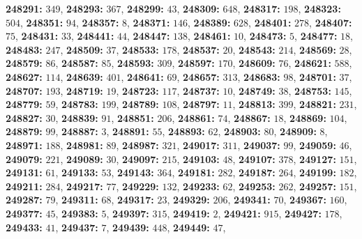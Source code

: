 \textsf{\bfseries 248291:} $349$, \textsf{\bfseries 248293:} $367$, \textsf{\bfseries 248299:} $43$, \textsf{\bfseries 248309:} $648$, \textsf{\bfseries 248317:} $198$, \textsf{\bfseries 248323:} $504$, \textsf{\bfseries 248351:} $94$, \textsf{\bfseries 248357:} $8$, \textsf{\bfseries 248371:} $146$, \textsf{\bfseries 248389:} $628$, \textsf{\bfseries 248401:} $278$, \textsf{\bfseries 248407:} $75$, \textsf{\bfseries 248431:} $33$, \textsf{\bfseries 248441:} $44$, \textsf{\bfseries 248447:} $138$, \textsf{\bfseries 248461:} $10$, \textsf{\bfseries 248473:} $5$, \textsf{\bfseries 248477:} $18$, \textsf{\bfseries 248483:} $247$, \textsf{\bfseries 248509:} $37$, \textsf{\bfseries 248533:} $178$, \textsf{\bfseries 248537:} $20$, \textsf{\bfseries 248543:} $214$, \textsf{\bfseries 248569:} $28$, \textsf{\bfseries 248579:} $86$, \textsf{\bfseries 248587:} $85$, \textsf{\bfseries 248593:} $309$, \textsf{\bfseries 248597:} $170$, \textsf{\bfseries 248609:} $76$, \textsf{\bfseries 248621:} $588$, \textsf{\bfseries 248627:} $114$, \textsf{\bfseries 248639:} $401$, \textsf{\bfseries 248641:} $69$, \textsf{\bfseries 248657:} $313$, \textsf{\bfseries 248683:} $98$, \textsf{\bfseries 248701:} $37$, \textsf{\bfseries 248707:} $193$, \textsf{\bfseries 248719:} $19$, \textsf{\bfseries 248723:} $117$, \textsf{\bfseries 248737:} $10$, \textsf{\bfseries 248749:} $38$, \textsf{\bfseries 248753:} $145$, \textsf{\bfseries 248779:} $59$, \textsf{\bfseries 248783:} $199$, \textsf{\bfseries 248789:} $108$, \textsf{\bfseries 248797:} $11$, \textsf{\bfseries 248813:} $399$, \textsf{\bfseries 248821:} $231$, \textsf{\bfseries 248827:} $30$, \textsf{\bfseries 248839:} $91$, \textsf{\bfseries 248851:} $206$, \textsf{\bfseries 248861:} $74$, \textsf{\bfseries 248867:} $18$, \textsf{\bfseries 248869:} $104$, \textsf{\bfseries 248879:} $99$, \textsf{\bfseries 248887:} $3$, \textsf{\bfseries 248891:} $55$, \textsf{\bfseries 248893:} $62$, \textsf{\bfseries 248903:} $80$, \textsf{\bfseries 248909:} $8$, \textsf{\bfseries 248971:} $188$, \textsf{\bfseries 248981:} $89$, \textsf{\bfseries 248987:} $321$, \textsf{\bfseries 249017:} $311$, \textsf{\bfseries 249037:} $99$, \textsf{\bfseries 249059:} $46$, \textsf{\bfseries 249079:} $221$, \textsf{\bfseries 249089:} $30$, \textsf{\bfseries 249097:} $215$, \textsf{\bfseries 249103:} $48$, \textsf{\bfseries 249107:} $378$, \textsf{\bfseries 249127:} $151$, \textsf{\bfseries 249131:} $61$, \textsf{\bfseries 249133:} $53$, \textsf{\bfseries 249143:} $364$, \textsf{\bfseries 249181:} $282$, \textsf{\bfseries 249187:} $264$, \textsf{\bfseries 249199:} $182$, \textsf{\bfseries 249211:} $284$, \textsf{\bfseries 249217:} $77$, \textsf{\bfseries 249229:} $132$, \textsf{\bfseries 249233:} $62$, \textsf{\bfseries 249253:} $262$, \textsf{\bfseries 249257:} $151$, \textsf{\bfseries 249287:} $79$, \textsf{\bfseries 249311:} $68$, \textsf{\bfseries 249317:} $23$, \textsf{\bfseries 249329:} $206$, \textsf{\bfseries 249341:} $70$, \textsf{\bfseries 249367:} $160$, \textsf{\bfseries 249377:} $45$, \textsf{\bfseries 249383:} $5$, \textsf{\bfseries 249397:} $315$, \textsf{\bfseries 249419:} $2$, \textsf{\bfseries 249421:} $915$, \textsf{\bfseries 249427:} $178$, \textsf{\bfseries 249433:} $41$, \textsf{\bfseries 249437:} $7$, \textsf{\bfseries 249439:} $448$, \textsf{\bfseries 249449:} $47$, 

